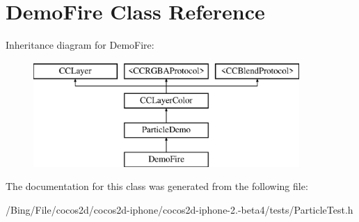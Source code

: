 \hypertarget{interface_demo_fire}{\section{Demo\-Fire Class Reference}
\label{interface_demo_fire}
}
Inheritance diagram for Demo\-Fire\-:\begin{figure}[H]
\begin{center}
\leavevmode
\includegraphics[height=4.000000cm]{interface_demo_fire}
\end{center}
\end{figure}


The documentation for this class was generated from the following file\-:\begin{DoxyCompactItemize}
\item 
/\-Bing/\-File/cocos2d/cocos2d-\/iphone/cocos2d-\/iphone-\/2.-\/beta4/tests/Particle\-Test.\-h\end{DoxyCompactItemize}
